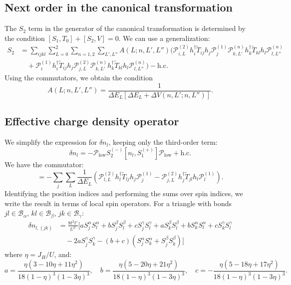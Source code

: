 \documentclass[11pt, a4paper]{article}
\begin{document}
\subsection{Next order in the canonical transformation}
The $S_2$ term in the generator of the canonical transformation is determined by the condition $[S_1, T_0] + [S_2, V] = 0$. We can use a generalization:
\begin{align}
S_2 &= \sum_{ijkl} \sum_{L=0}^2 \sum_{n=1,2} \sum_{L', L''} A(L; n, L', L'') \Big( \mathcal{P}_{i, L}^{(2)} h_i^{\dagger} \tilde{T}_{ij} h_j \mathcal{P}_j^{(1)} \mathcal{P}_{k, L'}^{(n)} h_k^{\dagger} \tilde{T}_{kl} h_l \mathcal{P}_{l, L''}^{(n)} \nonumber \\
&\quad + \mathcal{P}_i^{(1)} h_i^{\dagger} \tilde{T}_{ij} h_j \mathcal{P}_{j, L}^{(2)} \mathcal{P}_{k, L'}^{(n)} h_k^{\dagger} \tilde{T}_{kl} h_l \mathcal{P}_{l, L''}^{(n)} \Big) - \text{h.c.}
\end{align}
Using the commutators, we obtain the condition
\begin{equation}
A(L; n, L', L'') = \frac{1}{\Delta E_L [\Delta E_L + \Delta V(n, L'; n, L'')]}.
\end{equation}

\subsection{Effective charge density operator}
We simplify the expression for $\delta n_l$, keeping only the third-order term:
\begin{equation}
\delta n_l = -\mathcal{P}_{\text{low}} S_2^{(-)} [n_l, S_1^{(+)}] \mathcal{P}_{\text{low}} + \text{h.c.}
\end{equation}
We have the commutator:
\begin{equation}
[n_l, S_1^{(+)}] = -\sum_j \sum_L \frac{1}{\Delta E_L} \left( \mathcal{P}_{l, L}^{(2)} h_l^{\dagger} \tilde{T}_{lj} h_j \mathcal{P}_j^{(1)} - \mathcal{P}_{j, L}^{(2)} h_j^{\dagger} \tilde{T}_{jl} h_l \mathcal{P}_l^{(1)} \right).
\end{equation}
Identifying the position indices and performing the sums over spin indices, we write the result in terms of local spin operators. For a triangle with bonds $jl \in \mathcal{B}_\alpha$, $kl \in \mathcal{B}_\beta$, $jk \in \mathcal{B}_\gamma$:
\begin{align}
\delta n_{l, (jk)} &= \frac{8t^2 t'}{U^3} \Big[ a S_j^\alpha S_l^\alpha + b S_j^\beta S_l^\beta + c S_j^\gamma S_l^\gamma + a S_k^\beta S_l^\beta + b S_k^\alpha S_l^\alpha + c S_k^\gamma S_l^\gamma \nonumber \\
&\quad - 2a S_j^\gamma S_k^\gamma - (b+c)(S_j^\alpha S_k^\alpha + S_j^\beta S_k^\beta) \Big]
\end{align}
where $\eta = J_H/U$, and:
\begin{equation}
a = \frac{\eta(3 - 10\eta + 11\eta^2)}{18(1-\eta)^3(1-3\eta)^3}, \quad b = \frac{\eta(5 - 20\eta + 21\eta^2)}{18(1-\eta)^3(1-3\eta)^3}, \quad c = -\frac{\eta(5 - 18\eta + 17\eta^2)}{18(1-\eta)^3(1-3\eta)^3}.
\end{equation}
\end{document}
